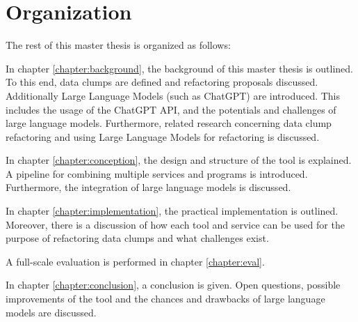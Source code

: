 \section{Organization}
The rest of this master thesis is organized as follows:

In chapter \ref{chapter:background}, the background of this master thesis  is outlined. To this end, data clumps are defined and refactoring proposals discussed. Additionally Large Language Models (such as ChatGPT) are introduced. This includes the usage of the ChatGPT \ac{API}, and the potentials and challenges of large language models.  Furthermore, related research concerning data clump refactoring and using Large Language Models for refactoring is discussed. 

In chapter \ref{chapter:conception}, the design and structure of the tool is explained. A pipeline for combining multiple services and programs is introduced. Furthermore, the integration of large language models is discussed. 

In chapter \ref{chapter:implementation}, the practical implementation is outlined.  Moreover, there is a discussion of how each tool and service can be used for the purpose of refactoring data clumps and what challenges exist. 

A full-scale evaluation is performed in chapter \ref{chapter:eval}.

In chapter \ref{chapter:conclusion}, a conclusion is given. Open questions, possible improvements of the tool and the chances and drawbacks of large language models are discussed.